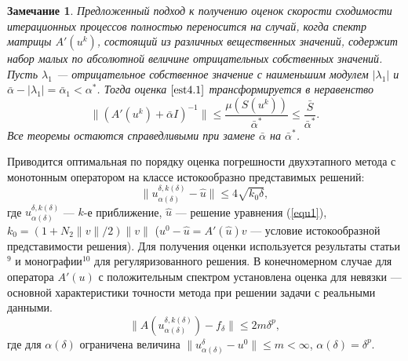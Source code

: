 \documentclass[%
autoref,     %
href,        %
colorlinks,  %
]{disser}
\newtheorem*{remark}{Замечание}
\begin{document}
\begin{remark}%
	Предложенный подход к получению оценок скорости сходимости итерационных процессов полностью переносится на случай, когда спектр матрицы $A'(u^k)$, состоящий из различных вещественных значений, содержит набор малых по абсолютной величине отрицательных собственных значений. Пусть $\lambda _1$ --- отрицательное собственное значение с наименьшим модулем $|\lambda_1|$ и $\bar\alpha -|\lambda _1|=\bar\alpha _1<\alpha^*$. Тогда оценка $\eqref{est4.1}$ 
	трансформируется в неравенство
	$$\|(A'(u^k)+\bar\alpha I)^{-1}\|\leqslant\frac{\mu(S(u^k))}{\bar\alpha^*}\leqslant\frac{\bar S}{\bar\alpha^*}.$$
	Все теоремы остаются справедливыми при замене $\bar\alpha$ на $\bar\alpha^*$.
\end{remark}

Приводится оптимальная по порядку оценка погрешности двухэтапного метода с монотонным оператором на классе истокообразно представимых решений:
\begin{equation*}
\|u_{\alpha(\delta)}^{\delta, k(\delta)}-\hat{u}\|\leqslant 4\sqrt{k_0 \delta},
\end{equation*}
где $u_{\alpha(\delta)}^{\delta, k(\delta)}$ --- $k$-е приближение, $\hat{u}$ --- решение уравнения (\ref{equ1}), $k_0=(1+N_2\|v\|/2)\|v\|$ ($u^0-\hat{u}=A'(\hat{u})v$ --- условие  истокообразной представимости решения). Для получения оценки используется результаты статьи$^{9}$ и монографии$^{10}$ для регуляризованного решения. В конечномерном случае для оператора $A'(u)$ с положительным спектром установлена оценка для невязки --- основной характеристики точности метода при решении задачи с реальными данными.
$$\|A(u_{\alpha(\delta)}^{\delta,k(\delta)})-f_\delta\|\leqslant 2m\delta^p,$$
где для $\alpha(\delta)$ ограничена величина $\|u_{\alpha(\delta)}^{\delta}-u^0\|\leqslant m <\infty$, $\alpha(\delta)=\delta^p$. 
{\scriptsize
\let\thefootnote\relax\let\thefootnote\relax{}
\let\thefootnote\relax\let\thefootnote\relax{}
}
\end{document}
